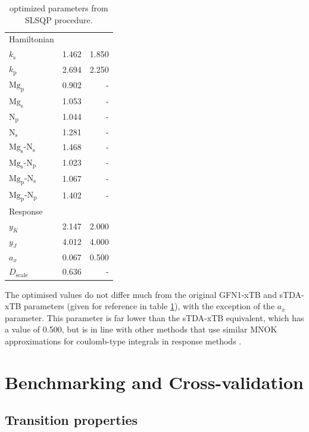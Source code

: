 \begin{table}
    \centering
    \begin{tabular}{|| l r | r ||}
    \hline
    Hamiltonian & & \\
    $k_\text{s}$ & 1.462 & 1.850 \\
    $k_\text{p}$ & 2.694 & 2.250 \\

    $\text{Mg}_\text{p}$ & 0.902 & - \\
    $\text{Mg}_\text{s}$ & 1.053 & - \\
    $\text{N}_\text{p}$ & 1.044 & - \\
    $\text{N}_\text{s}$ & 1.281 & - \\

    $\text{Mg}_\text{s}$-$\text{N}_\text{s}$ & 1.468 & - \\
    $\text{Mg}_\text{s}$-$\text{N}_\text{p}$ & 1.023 & - \\
    $\text{Mg}_\text{p}$-$\text{N}_\text{s}$ & 1.067 & - \\
    $\text{Mg}_\text{p}$-$\text{N}_\text{p}$ & 1.402 & - \\

    \hline\hline
    Response & & \\
    $y_K$ & 2.147 & 2.000 \\
    $y_J$ & 4.012 & 4.000 \\
    $a_x$ & 0.067 & 0.500 \\
    $D_{\text{scale}}$ & 0.636 & - \\
    \hline
    \end{tabular}
    \caption{optimized parameters from SLSQP procedure.}
    \label{table:chl_params}
\end{table}

The optimised values do not differ much from the original GFN1-xTB and sTDA-xTB
parameters (given for reference in table \ref{table:chl_params}), with the exception
of the $a_x$ parameter. This parameter is far lower than the sTDA-xTB equivalent,
which has a value of 0.500, but is in line with other methods that use similar MNOK
approximations for coulomb-type integrals in response methods \cite{Cho2021}.

\section{Benchmarking and Cross-validation}
\label{sec:chl_benchmarking}

\subsection{Transition properties}
\label{subsec:transition_properties}

